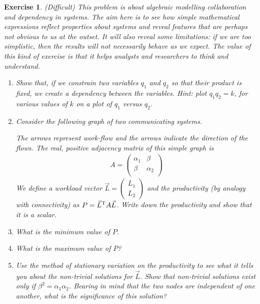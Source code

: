 \documentclass{book}
\newtheorem{exercise}{Exercise}
\def\beq{\begin{eqnarray}}
\def\eeq{\end{eqnarray}}
\begin{document}
\begin{exercise} 
(Difficult) This problem is about algebraic modelling collaboration
and dependency in systems. The aim here is to see how simple
mathematical expressions reflect properties about systems and reveal
features that are perhaps not obvious to us at the outset. It will
also reveal some limitations: if we are too simplistic, then the
results will not necessarily behave as we expect. The value of this
kind of exercise is that it helps analysts and researchers to think
and understand.

\begin{enumerate}
\item Show that, if we constrain two variables $q_1$ and $q_2$
so that their product is fixed, we create a {\em dependency}
between the variables. Hint: plot $q_1q_2 = k$, for various values
of $k$ on a plot of $q_1$ versus $q_2$.

\item Consider the following graph of two communicating systems.
\begin{figure}[ht]
\end{figure}
The arrows represent work-flow and the arrows indicate the direction
of the flows. The real, positive adjacency matrix of this simple graph is
\beq
A = \left(
\begin{array}{cc}
\alpha_1 & \beta\\
\beta & \alpha_2\\
\end{array}
\right)
\eeq
We define a workload vector $\vec L = \left(\begin{array}{c}
L_1\\L_2
\end{array}\right)$ and the productivity (by analogy with connectivity)
as $P = \vec L^{\rm T} A \vec L$.
Write down the productivity and show that it is a scalar.

\item What is the minimum value of $P$. 
\item What is the maximum value of $P$?
\item Use the method of stationary variation on the productivity to
see what it tells you about the non-trivial solutions for $\vec L$.
Show that non-trivial solutions exist only if $\beta^2 = \alpha_1\alpha_2$.
Bearing in mind that the two nodes are independent of one another,
what is the significance of this solution?


\end{enumerate}
\end{exercise}
\end{document}
